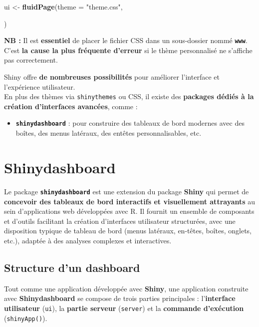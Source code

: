 \documentclass[
]{article}
\newenvironment{Shaded}{\begin{snugshade}}{\end{snugshade}}
\newcommand{\AttributeTok}[1]{\textcolor[rgb]{0.13,0.29,0.53}{#1}}
\newcommand{\FunctionTok}[1]{\textcolor[rgb]{0.13,0.29,0.53}{\textbf{#1}}}
\newcommand{\NormalTok}[1]{#1}
\newcommand{\OtherTok}[1]{\textcolor[rgb]{0.56,0.35,0.01}{#1}}
\newcommand{\StringTok}[1]{\textcolor[rgb]{0.31,0.60,0.02}{#1}}
\providecommand{\tightlist}{%
  \setlength{\itemsep}{0pt}\setlength{\parskip}{0pt}}
\begin{document}
\begin{Shaded}
\begin{Highlighting}[]
\NormalTok{ui }\OtherTok{\textless{}{-}} \FunctionTok{fluidPage}\NormalTok{(}\AttributeTok{theme =} \StringTok{"theme.css"}\NormalTok{,}
                
\NormalTok{)}
\end{Highlighting}
\end{Shaded}

\textbf{NB :} Il est \textbf{essentiel} de placer le fichier CSS dans un
sous-dossier nommé \textbf{\texttt{www}}. C'est \textbf{la cause la plus
fréquente d'erreur} si le thème personnalisé ne s'affiche pas
correctement.

Shiny offre \textbf{de nombreuses possibilités} pour améliorer
l'interface et l'expérience utilisateur.\\
En plus des thèmes via \texttt{shinythemes} ou CSS, il existe des
\textbf{packages dédiés à la création d'interfaces avancées}, comme :

\begin{itemize}
\tightlist
\item
  \textbf{\texttt{shinydashboard}} : pour construire des tableaux de
  bord modernes avec des boîtes, des menus latéraux, des entêtes
  personnalisables, etc.
\end{itemize}

\newpage

\section{Shinydashboard}\label{shinydashboard}

Le package \textbf{\texttt{shinydashboard}} est une extension du package
\textbf{Shiny} qui permet de \textbf{concevoir des tableaux de bord
interactifs et visuellement attrayants} au sein d'applications web
développées avec R. Il fournit un ensemble de composants et d'outils
facilitant la création d'interfaces utilisateur structurées, avec une
disposition typique de tableau de bord (menus latéraux, en-têtes,
boîtes, onglets, etc.), adaptée à des analyses complexes et
interactives.

\subsection{Structure d'un dashboard}\label{structure-dun-dashboard}

Tout comme une application développée avec \textbf{Shiny}, une
application construite avec \textbf{Shinydashboard} se compose de trois
parties principales : l'\textbf{interface utilisateur} (\texttt{ui}), la
\textbf{partie serveur} (\texttt{server}) et la \textbf{commande
d'exécution} (\texttt{shinyApp()}).
\end{document}
